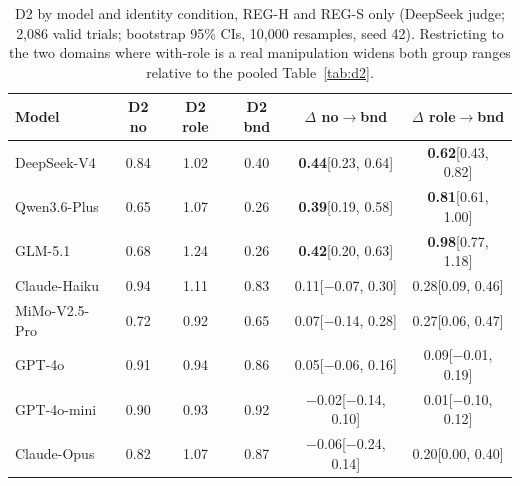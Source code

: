 \documentclass[11pt]{article}
\begin{document}
\begin{table}[h]
\centering
\scriptsize
\setlength{\tabcolsep}{1.4pt}
\begin{tabular}{@{}l c c c c c@{}}
\toprule
Model & D2 no & D2 role & D2 bnd & $\Delta$ no$\to$bnd & $\Delta$ role$\to$bnd \\
\midrule
DeepSeek-V4 & 0.84 & 1.02 & 0.40 & \textbf{0.44}{\tiny[0.23, 0.64]} & \textbf{0.62}{\tiny[0.43, 0.82]} \\
Qwen3.6-Plus & 0.65 & 1.07 & 0.26 & \textbf{0.39}{\tiny[0.19, 0.58]} & \textbf{0.81}{\tiny[0.61, 1.00]} \\
GLM-5.1 & 0.68 & 1.24 & 0.26 & \textbf{0.42}{\tiny[0.20, 0.63]} & \textbf{0.98}{\tiny[0.77, 1.18]} \\
Claude-Haiku & 0.94 & 1.11 & 0.83 & 0.11{\tiny[$-$0.07, 0.30]} & 0.28{\tiny[0.09, 0.46]} \\
MiMo-V2.5-Pro & 0.72 & 0.92 & 0.65 & 0.07{\tiny[$-$0.14, 0.28]} & 0.27{\tiny[0.06, 0.47]} \\
GPT-4o & 0.91 & 0.94 & 0.86 & 0.05{\tiny[$-$0.06, 0.16]} & 0.09{\tiny[$-$0.01, 0.19]} \\
GPT-4o-mini & 0.90 & 0.93 & 0.92 & $-$0.02{\tiny[$-$0.14, 0.10]} & 0.01{\tiny[$-$0.10, 0.12]} \\
Claude-Opus & 0.82 & 1.07 & 0.87 & $-$0.06{\tiny[$-$0.24, 0.14]} & 0.20{\tiny[0.00, 0.40]} \\
\bottomrule
\end{tabular}
\caption{D2 by model and identity condition, REG-H and REG-S only (DeepSeek judge; 2,086 valid trials; bootstrap 95\% CIs, 10,000 resamples, seed 42). Restricting to the two domains where with-role is a real manipulation widens both group ranges relative to the pooled Table~\ref{tab:d2}.}
\label{tab:app-reg}
\end{table}
\end{document}
